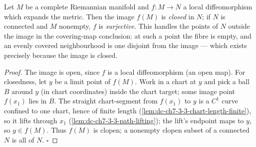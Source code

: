 \begin{lemma}
  \label{lem:dc-ch7-3-3-closed-image}
  \leanok
  Let $M$ be a complete Riemannian manifold and $f:M\to N$ a local diffeomorphism
  which expands the metric. Then the image $f(M)$ is \emph{closed} in $N$; if $N$ is
  connected and $M$ nonempty, $f$ is \emph{surjective}. This handles the points of
  $N$ outside the image in the covering-map conclusion: at such a point the fibre is
  empty, and an evenly covered neighbourhood is one disjoint from the image — which
  exists precisely because the image is closed.
\end{lemma}
\begin{proof}
  \leanok
  The image is open, since $f$ is a local diffeomorphism (an open map). For
  closedness, let $y$ be a limit point of $f(M)$. Work in a chart at $y$ and pick a
  ball $B$ around $y$ (in chart coordinates) inside the chart target; some image
  point $f(x_1)$ lies in $B$. The straight chart-segment from $f(x_1)$ to $y$ is a
  $C^1$ curve confined to one chart, hence of finite length
  (\cref{lem:dc-ch7-3-3-chart-length-finite}), so it lifts through $x_1$
  (\cref{lem:dc-ch7-3-3-path-lifting}); the lift's endpoint maps to $y$, so
  $y\in f(M)$. Thus $f(M)$ is clopen; a nonempty clopen subset of a connected $N$ is
  all of $N$. $\square$
\end{proof}

